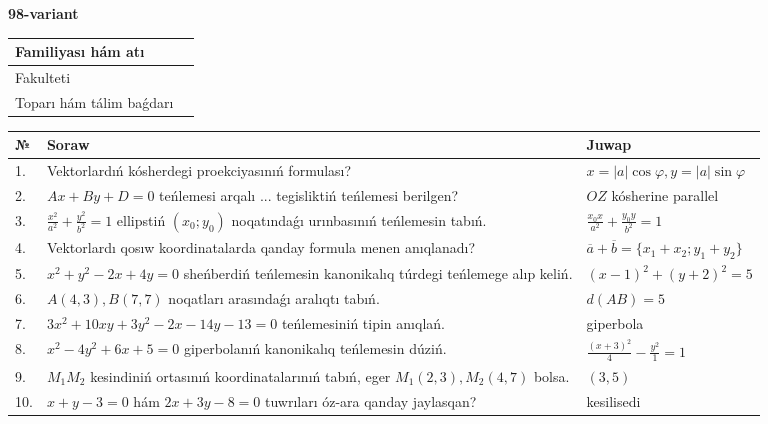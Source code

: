 \documentclass{article}
\begin{document}
\egroup

\newpage


\textbf{98-variant}\\

\bgroup
\def\arraystretch{1.6} %

\begin{tabular}{|m{5.7cm}|m{9.5cm}|}
\hline
Familiyası hám atı & \\
\hline
Fakulteti  & \\
\hline
Toparı hám tálim baǵdarı  & \\
\hline
\end{tabular}

\vspace{1cm}

\begin{tabular}{|m{0.7cm}|m{10cm}|m{4cm}|}
\hline
№ & Soraw & Juwap \\
\hline
1. & Vektorlardıń kósherdegi proekciyasınıń formulası? & $x=|a|\cos\varphi, y=|a|\sin\varphi$ \\
\hline
2. & $Ax+By+D=0$ teńlemesi arqalı ... tegisliktiń teńlemesi berilgen? & $OZ$ kósherine parallel \\
\hline
3. & $\frac{x^2}{a^2}+\frac{y^2}{b^2}=1$ ellipstiń $(x_0;y_0)$ noqatındaǵı urınbasınıń teńlemesin tabıń. & $\frac{x_0x}{a^2}+\frac{y_0y}{b^2}=1$ \\
\hline
4. & Vektorlardı qosıw koordinatalarda qanday formula menen anıqlanadı? & $\overline{a}+\overline{b}=\{x_1+x_2;y_1+y_2\}$ \\
\hline
5. & $x^{2}+y^{2}-2x+4y=0$ sheńberdiń teńlemesin kanonikalıq túrdegi teńlemege alıp keliń. & $(x-1)^{2}+(y+2)^{2}=5$ \\
\hline
6. & $A(4, 3), B(7, 7)$ noqatları arasındaǵı aralıqtı tabıń. & $d(AB)=5$ \\
\hline
7. & $3x^{2}+10xy+3y^{2}-2x-14y-13=0$ teńlemesiniń tipin anıqlań. & giperbola \\
\hline
8. & $x^{2}-4y^{2}+6x+5=0$ giperbolanıń kanonikalıq teńlemesin dúziń. & $\frac{(x+3)^{2}}{4}-\frac{y^{2}}{1}=1$ \\
\hline
9. & $M_{1}M_{2}$ kesindiniń ortasınıń koordinatalarınıń tabıń, eger $M_{1} (2, 3), M_{2} (4, 7)$ bolsa. & $(3,5)$ \\
\hline
10. & $x+y-3=0$ hám $2x+3y-8=0$ tuwrıları óz-ara qanday jaylasqan? & kesilisedi \\
\hline
\end{tabular}

\vspace{1cm}
\end{document}
